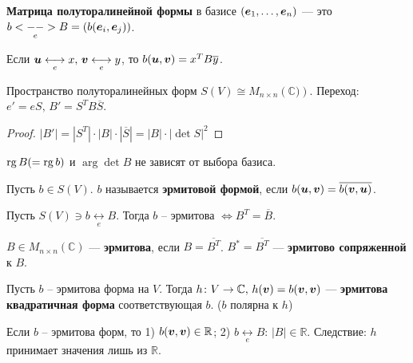 \begin{to_def} 
	\textbf{Матрица полуторалинейной формы} в базисе $(\mbox{\boldmath $e$}_1,\ldots,\mbox{\boldmath $e$}_n)$ --- это $b \underset{e}{<-->} B = (b(\mbox{\boldmath $e$}_i, \mbox{\boldmath $e$}_j))$. 

	Если $\mbox{\boldmath $u$} \underset{e}{\longleftrightarrow} x, \, \mbox{\boldmath $v$} \underset{e}{\longleftrightarrow} y$, то $b(\mbox{\boldmath $u$},\mbox{\boldmath $v$}) = x^T B \overline{y}$.
\end{to_def}

\begin{to_thr} 
	Пространство полуторалинейных форм $S(V) \cong M_{n\times n}(\mathbb{C)})$. Переход: $e' = e S, \, B' = S^T B \overline{S}$.
\end{to_thr}

\begin{proof}
	$|B'| = |S^T| \cdot |B| \cdot |\overline{S}| = |B| \cdot |\det S|^2$
\end{proof}

\begin{to_con}
	$\mathop{\mathrm{rg}}\nolimits B(=\mathop{\mathrm{rg}}\nolimits b)$ и $\arg \det B$ не зависят от выбора базиса. 
\end{to_con}

\begin{to_def} 
	Пусть $b \in S(V)$. $b$ называется \textbf{эрмитовой формой}, если $b(\mbox{\boldmath $u$},\mbox{\boldmath $v$}) = \overline{b(\mbox{\boldmath $v$},\mbox{\boldmath $u$})}$.   
\end{to_def}

\begin{to_lem}
	Пусть $S(V) \ni b \underset{e}{\longleftrightarrow} B$. Тогда $b$ -- эрмитова $\Longleftrightarrow B^T = \overline{B}$.
\end{to_lem}

\begin{to_def} 
	$B \in M_{n \times n}(\mathbb{C})$ --- \textbf{эрмитова}, если $B = \overline{B^T}$. $B^* = \overline{B^T}$ --- \textbf{эрмитово сопряженной } к $B$.
\end{to_def}

\begin{to_def}
	Пусть $b$ -- эрмитова форма на $V$. Тогда $h \colon V \to \mathbb{C}, \, h(\mbox{\boldmath $v$}) = b(\mbox{\boldmath $v$},\mbox{\boldmath $v$})$ --- \textbf{эрмитова квадратичная форма} соответствующая $b$. ($b$ полярна к $h$)
\end{to_def}
	
\begin{to_lem}
	Если $b$ -- эрмитова форм, то 1) $b (\mbox{\boldmath $v$},\mbox{\boldmath $v$}) \in \mathbb{R}$; 2) $b \underset{e}{\longleftrightarrow} B:\, |B| \in \mathbb{R}$.	Следствие: $h$ принимает значения лишь из $\mathbb{R}$.
\end{to_lem}

